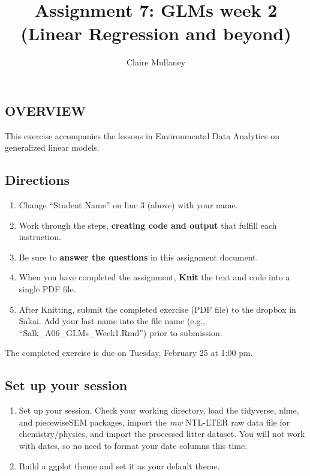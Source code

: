 \documentclass[]{article}
\title{Assignment 7: GLMs week 2 (Linear Regression and beyond)}
\author{Claire Mullaney}
\date{}
\providecommand{\tightlist}{%
  \setlength{\itemsep}{0pt}\setlength{\parskip}{0pt}}
\begin{document}
\maketitle

\hypertarget{overview}{%
\subsection{OVERVIEW}\label{overview}}

This exercise accompanies the lessons in Environmental Data Analytics on
generalized linear models.

\hypertarget{directions}{%
\subsection{Directions}\label{directions}}

\begin{enumerate}
\def\labelenumi{\arabic{enumi}.}
\tightlist
\item
  Change ``Student Name'' on line 3 (above) with your name.
\item
  Work through the steps, \textbf{creating code and output} that fulfill
  each instruction.
\item
  Be sure to \textbf{answer the questions} in this assignment document.
\item
  When you have completed the assignment, \textbf{Knit} the text and
  code into a single PDF file.
\item
  After Knitting, submit the completed exercise (PDF file) to the
  dropbox in Sakai. Add your last name into the file name (e.g.,
  ``Salk\_A06\_GLMs\_Week1.Rmd'') prior to submission.
\end{enumerate}

The completed exercise is due on Tuesday, February 25 at 1:00 pm.

\hypertarget{set-up-your-session}{%
\subsection{Set up your session}\label{set-up-your-session}}

\begin{enumerate}
\def\labelenumi{\arabic{enumi}.}
\item
  Set up your session. Check your working directory, load the tidyverse,
  nlme, and piecewiseSEM packages, import the \emph{raw} NTL-LTER raw
  data file for chemistry/physics, and import the processed litter
  dataset. You will not work with dates, so no need to format your date
  columns this time.
\item
  Build a ggplot theme and set it as your default theme.
\end{enumerate}
\end{document}
